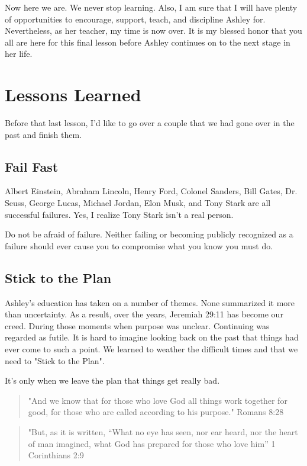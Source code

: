 \documentclass[11pt,a4paper,sans]{article}
\begin{document}
Now here we are. We never stop learning. Also, I am sure that I will have plenty of opportunities
to encourage, support, teach, and discipline Ashley for. Nevertheless, as her teacher, my time
is now over. It is my blessed honor that you all are here for this final lesson before Ashley
continues on to the next stage in her life.

\section{Lessons Learned}
Before that last lesson, I'd like to go over a couple that we had gone over in the past and
finish them.

\subsection{Fail Fast}
Albert Einstein, Abraham Lincoln, Henry Ford, Colonel Sanders, Bill Gates, Dr. Seuss, 
George Lucas, Michael Jordan, Elon Musk, and Tony Stark are all successful failures. Yes, I 
realize Tony Stark isn't a real person. 

Do not be afraid of failure. Neither failing or becoming publicly recognized as a failure 
should ever cause you to compromise what you know you must do. 

\subsection{Stick to the Plan}
Ashley's education has taken on a number of themes. None summarized it more than uncertainty.
As a result, over the years, Jeremiah 29:11 has become our creed. During those moments when 
purpose was unclear. Continuing was regarded as futile. It is hard to imagine looking back on
the past that things had ever come to such a point. We learned to weather the difficult times
and that we need to "Stick to the Plan". 

It's only when we leave the plan that things get really bad.

\begin{quote}
    "And we know that for those who love God all things work together for good, for those who 
    are called according to his purpose." Romans 8:28
\end{quote}

\begin{quote}
    "But, as it is written, “What no eye has seen, nor ear heard, nor the heart of man imagined, what God has prepared for those who love him” 1 Corinthians 2:9
\end{quote}
\end{document}
